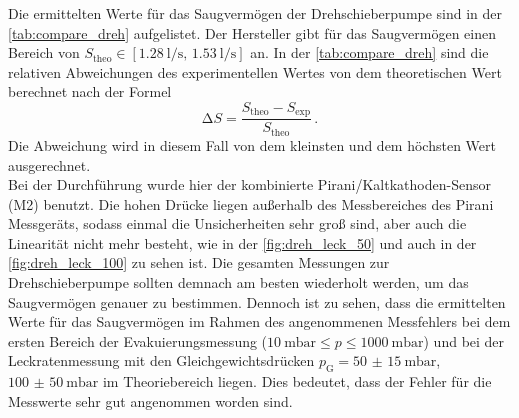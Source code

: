 \noindent Die ermittelten Werte für das Saugvermögen der Drehschieberpumpe sind in der \autoref{tab:compare_dreh} aufgelistet. Der Hersteller gibt für das Saugvermögen einen Bereich 
von $ S_\text{theo} \in [\SI{1.28}{\litre\per\second},\, \SI{1.53}{\litre\per\second}]$ \cite{anleitung} an. In der \autoref{tab:compare_dreh} sind die relativen Abweichungen des experimentellen Wertes von 
dem theoretischen Wert berechnet nach der Formel 
\begin{equation}
    \increment S = \frac{S_\text{theo} - S_\text{exp}}{S_\text{theo}}\, .
    \label{eqn:rel_abw}
\end{equation}
Die Abweichung wird in diesem Fall von dem kleinsten und dem höchsten Wert ausgerechnet. \\
Bei der Durchführung wurde hier der kombinierte Pirani/Kaltkathoden-Sensor (M2) benutzt. Die hohen Drücke liegen außerhalb des Messbereiches des Pirani Messgeräts, 
sodass einmal die Unsicherheiten sehr groß sind, aber auch die Linearität nicht mehr besteht, wie in der \autoref{fig:dreh_leck_50} und auch in der \autoref{fig:dreh_leck_100} zu sehen ist. 
Die gesamten Messungen zur Drehschieberpumpe sollten demnach am besten wiederholt werden, um das Saugvermögen genauer zu bestimmen. 
Dennoch ist zu sehen, dass die ermittelten Werte für das Saugvermögen im Rahmen des angenommenen Messfehlers bei dem ersten Bereich der Evakuierungsmessung 
($\SI{10}{\milli\bar} \leq p \leq \SI{1000}{\milli\bar}$) und bei der Leckratenmessung mit den Gleichgewichtsdrücken $p_\text{G} = \SI{50(15)}{\milli\bar}$, $\SI{100(50)}{\milli\bar}$ im Theoriebereich liegen. 
Dies bedeutet, dass der Fehler für die Messwerte sehr gut angenommen worden sind. \\
